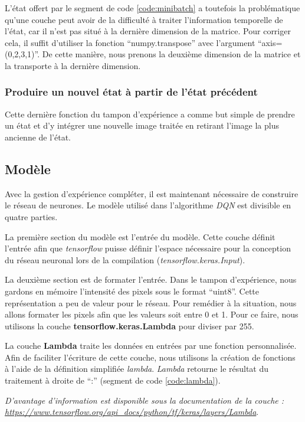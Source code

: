 \documentclass{article}
\begin{document}
L'état offert par le segment de code \ref{code:minibatch} a toutefois la problématique qu'une couche peut avoir de la difficulté à traiter l'information temporelle de l'état, car il n'est pas situé à la dernière dimension de la matrice. Pour corriger cela, il suffit d'utiliser la fonction ``numpy.transpose'' avec l'argument ``axis=(0,2,3,1)''. De cette manière, nous prenons la deuxième dimension de la matrice et la transporte à la dernière dimension.

\subsubsection{Produire un nouvel état à partir de l'état précédent}
Cette dernière fonction du tampon d'expérience a comme but simple de prendre un état et d'y intégrer une nouvelle image traitée en retirant l'image la plus ancienne de l'état.

\subsection{Modèle}
Avec la gestion d'expérience compléter, il est maintenant nécessaire de construire le réseau de neurones. Le modèle utilisé dans l'algorithme \textit{DQN} est divisible en quatre parties.

\bigbreak
La première section du modèle est l'entrée du modèle. Cette couche définit l'entrée afin que \textit{tensorflow} puisse définir l'espace nécessaire pour la conception du réseau neuronal lors de la compilation (\textit{tensorflow.keras.Input}).

\bigbreak
La deuxième section est de formater l'entrée. Dans le tampon d'expérience, nous gardons en mémoire l'intensité des pixels sous le format ``uint8''. Cette représentation a peu de valeur pour le réseau. Pour remédier à la situation, nous allons formater les pixels afin que les valeurs soit entre 0 et 1. Pour ce faire, nous utilisons la couche \textbf{tensorflow.keras.Lambda} pour diviser par 255.

\bigbreak
La couche \textbf{Lambda} traite les données en entrées par une fonction personnalisée. Afin de faciliter l'écriture de cette couche, nous utilisons la création de fonctions à l'aide de la définition simplifiée \textit{lambda}. \textit{Lambda} retourne le résultat du traitement à droite de ``:'' (segment de code \ref{code:lambda}).

\textit{D'avantage d'information est disponible sous la documentation de la couche : \href{https://www.tensorflow.org/api\_docs/python/tf/keras/layers/Lambda}{https://www.tensorflow.org/api\_docs/python/tf/keras/layers/Lambda}}.
\end{document}
